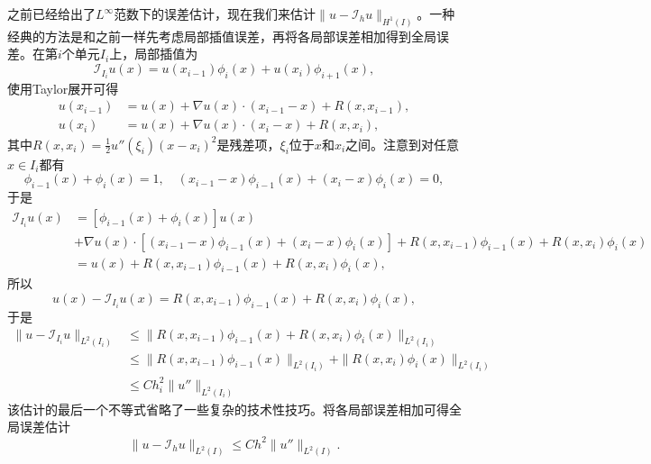 \documentclass[a4paper,10pt]{ctexart}
\begin{document}
之前已经给出了$ L^\infty $范数下的误差估计，现在我们来估计$ \| u-\mathcal{I}_h u \|_{H^1(I)} $。一种经典的方法是和之前一样先考虑局部插值误差，再将各局部误差相加得到全局误差。在第$ i $个单元$ I_i $上，局部插值为
\begin{equation}
    \mathcal{I}_{I_i} u(x) = u(x_{i-1})\phi_i(x) + u(x_i)\phi_{i+1}(x),
\end{equation}
使用Taylor展开可得
\begin{equation}
    \begin{aligned}
        u(x_{i-1}) &= u(x) + \nabla u(x)\cdot (x_{i-1}-x) + R(x,x_{i-1}),\\
        u(x_i) &= u(x) + \nabla u(x)\cdot (x_i-x) + R(x,x_i),
    \end{aligned}
\end{equation}
其中$ R(x,x_i) = \frac{1}{2}u''(\xi_i)(x-x_i)^2 $是残差项，$ \xi_i $位于$ x $和$ x_i $之间。注意到对任意$ x\in I_i $都有
\[
    \phi_{i-1}(x) + \phi_i(x) = 1,\quad (x_{i-1}-x)\phi_{i-1}(x) + (x_i-x)\phi_i(x) = 0,
\]
于是
\begin{equation}
    \begin{aligned}
        \mathcal{I}_{I_i} u(x) &= [\phi_{i-1}(x)+\phi_i(x)]u(x) \\
        &+ \nabla u(x)\cdot \left[ (x_{i-1}-x)\phi_{i-1}(x) + (x_i-x)\phi_i(x) \right] + R(x,x_{i-1})\phi_{i-1}(x) + R(x,x_i)\phi_i(x)\\
        &= u(x) + R(x,x_{i-1})\phi_{i-1}(x) + R(x,x_i)\phi_i(x),
    \end{aligned}
\end{equation}
所以
\begin{equation}
    u(x) - \mathcal{I}_{I_i} u(x) = R(x,x_{i-1})\phi_{i-1}(x) + R(x,x_i)\phi_i(x),
\end{equation}
于是
\begin{equation}
    \begin{aligned}
        \| u-\mathcal{I}_{I_i}u \|_{L^2(I_i)} 
        &\leqslant \| R(x,x_{i-1})\phi_{i-1}(x) + R(x,x_i)\phi_i(x) \|_{L^2(I_i)} \\
        &\leqslant \| R(x,x_{i-1})\phi_{i-1}(x) \|_{L^2(I_i)} + \| R(x,x_i)\phi_i(x) \|_{L^2(I_i)}\\
        &\leqslant Ch_i^2\| u'' \|_{L^2(I_i)}
    \end{aligned}
\end{equation}
该估计的最后一个不等式省略了一些复杂的技术性技巧。将各局部误差相加可得全局误差估计
\begin{equation}
    \| u-\mathcal{I}_h u \|_{L^2(I)} \leqslant Ch^2\| u'' \|_{L^2(I)}.
\end{equation}
\end{document}
